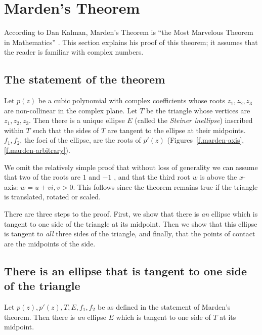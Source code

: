 
\section{Marden's Theorem}\label{s.marden}

According to Dan Kalman, Marden's Theorem is ``the Most Marvelous
Theorem in Mathematics'' \cite{marden-marvelous}. This section explains his proof of this theorem; it assumes that the reader is familiar with complex numbers.

\subsection*{The statement of the theorem}

\begin{theorem}[Marden]\label{thm.marden}
Let $p(z)$ be a cubic polynomial with complex coefficients whose roots $z_1,z_2,z_3$ are non-collinear in the complex plane. Let $T$ be the triangle whose vertices are $z_1,z_2,z_3$. Then there is a unique ellipse $E$ (called the \emph{Steiner inellipse}) inscribed within $T$ such that the sides of $T$ are tangent to the ellipse at their midpoints. $f_1,f_2$, the foci of the ellipse, are the roots of $p'(z)$ (Figures~\ref{f.marden-axis}, \ref{f.marden-arbitrary}).
\end{theorem}
We omit the relatively simple proof that without loss of generality we can assume that two of the roots are $1$ and $-1$ \cite[p.~332]{marden}, and that the third root $w$ is above the $x$-axis: $w=u+vi,v>0$. This follows since the theorem remains true if the triangle is translated, rotated or scaled.

There are three steps to the proof. First, we show that there is \emph{an} ellipse which is tangent to one side of the triangle at its midpoint. Then we show that this ellipse is tangent to \emph{all} three sides of the triangle, and finally, that the points of contact are the midpoints of the side.

\subsection*{There is an ellipse that is tangent to one side of the triangle}

\begin{theorem}\label{thm.marden1}
Let $p(z),p'(z),T,E,f_1,f_2$ be as defined in the statement of Marden's theorem. Then there is \emph{an} ellipse $E$ which is tangent to one side of $T$ at its midpoint.
\end{theorem}

